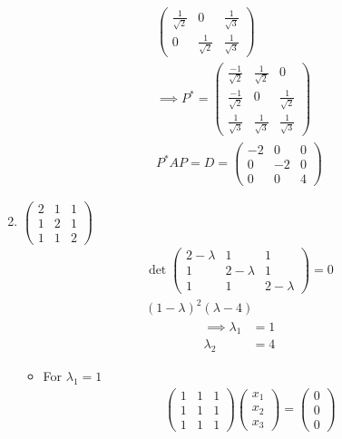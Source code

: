 \begin{enumerate}
\begin{gather}
\begin{pmatrix}
\frac{1}{\sqrt{2}} & 0 & \frac{1}{\sqrt{3}}\\
0 & \frac{1}{\sqrt{2}} & \frac{1}{\sqrt{3}}
\end{pmatrix}\\
\implies P^* = \begin{pmatrix}
\frac{-1}{\sqrt{2}} & \frac{1}{\sqrt{2}} & 0\\
\frac{-1}{\sqrt{2}} & 0 & \frac{1}{\sqrt{2}}\\
\frac{1}{\sqrt{3}} & \frac{1}{\sqrt{3}} & \frac{1}{\sqrt{3}}
\end{pmatrix}\\
P^*AP = D = \begin{pmatrix}
-2 & 0 & 0\\
0 & -2 & 0\\
0 & 0 & 4
\end{pmatrix}
\end{gather}
\item $\begin{pmatrix}
2 & 1 & 1 \\
1 & 2 & 1\\
1 & 1 & 2
  \end{pmatrix}$
\begin{gather}
\det{
\begin{pmatrix}
2-\lambda & 1 & 1 \\
1 & 2-\lambda & 1\\
1 & 1 & 2-\lambda
\end{pmatrix}
}=0\\
(1-\lambda)^2(\lambda-4)
\end{gather}
\begin{align}
\implies \lambda_1 &= 1\\
\lambda_2 &= 4
\end{align}
\begin{itemize}
\item For $\lambda_1=1$
\begin{gather}
\begin{pmatrix}
1 & 1 & 1\\
1 & 1 & 1\\
1 & 1 & 1
\end{pmatrix}
\begin{pmatrix}
x_1\\x_2\\x_3
\end{pmatrix}
=
\begin{pmatrix}
0\\0\\0
\end{pmatrix}\\

\end{gather}
\end{itemize}
\end{enumerate}
